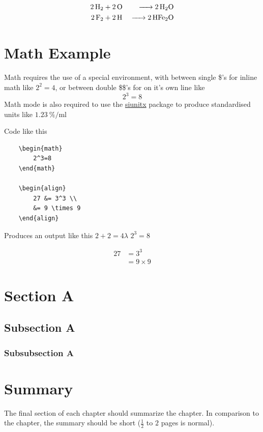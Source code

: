 \begin{align}
    \ce{2H2& + 2O &-> 2H2O} \\
   \ce{2F2& + 2H &-> 2HFe2O}
\end{align}


\section{Math Example}
Math requires the use of a special environment, with between single \$'s for inline math like $2^2=4$, or between double \$\$'s for on it's own line like $$2^3=8$$ Math mode is also required to use the \href{https://mirror.aarnet.edu.au/pub/CTAN/macros/latex/contrib/siunitx/siunitx.pdf}{siunitx} package to produce standardised units like $\SI{1.23}{\percent\per\milli\litre}$

Code like this \cite{Herbert:1981:Children-of-Dune}



\begin{lstlisting}
    \begin{math}
        2^3=8
    \end{math}
    
    \begin{align}
        27 &= 3^3 \\
        &= 9 \times 9
    \end{align}
\end{lstlisting}
Produces an output like this  $2+2=4 \lambda$
    \begin{math}
        2^3=8
    \end{math}
    
    \begin{align}
        27 &= 3^3 \\
        &= 9 \times 9
    \end{align}
\section{Section A}\label{sec:section_a}
\subsection{Subsection A}
\subsubsection{Subsubsection A}
    
    
    
\section{Summary}
\label{s:Background-Summary}

The final section of each chapter should summarize the chapter. In comparison to the chapter, the summary should be short ($\frac{1}{2}$ to $2$ pages is normal).


